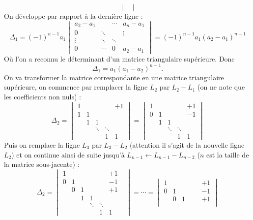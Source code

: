 {{$$\begin{vmatrix}
   \end{vmatrix}$$
On développe par rapport à la dernière ligne :
$$\Delta_1 = (-1)^{n-1}a_1 \begin{vmatrix}
     a_2-a_1  &  &\cdots&a_n -a_1   \\
     0  &\ddots &&\vdots \\
     \vdots &\ddots&\ddots&    \\
     0&\cdots&0   & a_2-a_1
   \end{vmatrix}
= (-1)^{n-1}a_1(a_2-a_1)^{n-1}
$$
Où l'on a reconnu le déterminant d'un matrice triangulaire supérieure.
Donc 
$$\Delta_1 = a_1(a_1-a_2)^{n-1}.$$
On va transformer la matrice correspondante en une matrice triangulaire supérieure,
on commence par remplacer la ligne $L_2$ par $L_2-L_1$ (on ne note que les coefficients non nuls) : 
$$\Delta_2 =   \begin{vmatrix}
  1 &      &    &   &+1 \\
  1 &1      && &  \\
   &1      &1  & &\\
   & &\ddots &\ddots & \\
  &  &       &1      &1
\end{vmatrix}=
 \begin{vmatrix}
  1 &      &    &   &+1 \\
  0 &1      && &  -1\\
   &1      &1  & &\\
   & &\ddots &\ddots & \\
  &  &       &1      &1
\end{vmatrix}
$$
Puis on remplace la ligne $L_3$ par $L_3-L_2$ (attention il s'agit de la nouvelle ligne $L_2$) et on 
continue ainsi de suite jusqu'à $L_{n-1} \leftarrow L_{n-1}-L_{n-2}$ ($n$ est la taille de la matrice sous-jacente) :
$$\Delta_2 =   \begin{vmatrix}
  1 &      &    &   &&+1 \\
  0 &1      && &  &-1\\
    & 0      &1  & & &+1\\
    & & 1      &1  & && \\
   & &&\ddots &\ddots & \\
  &  &       &&1      &1                 
               \end{vmatrix}
= \cdots = 
\begin{vmatrix}
  1 &      &    &   &&+1 \\
  0 &1      && &  &-1\\
    & 0      &1  & & &+1\\

\end{vmatrix}$$}}
